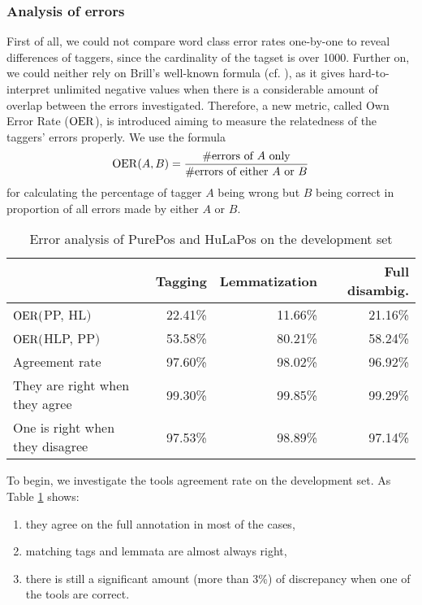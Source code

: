 \subsubsection{Analysis of errors}

First of all, we could not compare word class error rates one-by-one to reveal differences of taggers, since the cardinality of the tagset is over 1000.
Further on, we could neither rely on Brill's well-known formula (cf. \cite{Brill1998}), as it gives hard-to-interpret unlimited negative values when there is a considerable amount of overlap between the errors investigated.
Therefore, a new metric, called Own Error Rate ($\operatorname{OER}$), is introduced aiming to measure the relatedness of the taggers' errors properly.
We use the formula 
\begin{equation}
\operatorname{OER}(A,B)=\frac{\text{\#errors of }A\text{ only}}{\text{\#errors of either }A\text{ or }B}
\end{equation}
for calculating the percentage of tagger $A$ being wrong but $B$ being correct in proportion of all errors made by either $A$ or $B$.

\begin{table}[h]
\centering
\caption{Error analysis of PurePos and HuLaPos on the development set}\label{tab:comb-disambig-comp}
\begin{tabular}{l r r r}
\hline
& Tagging & Lemmatization & Full disambig. \\
\hline
$\operatorname{OER}($PP, HL$)$ & 22.41\% & 11.66\% & 21.16\% \\
$\operatorname{OER}($HLP, PP$)$ & 53.58\% & 80.21\% & 58.24\% \\
Agreement rate & 97.60\% & 98.02\% & 96.92\% \\
They are right when they agree & 99.30\% & 99.85\% & 99.29\% \\
One is right when they disagree & 97.53\% & 98.89\% & 97.14\% \\
\hline
\end{tabular}
\end{table}

To begin, we investigate the tools agreement rate on the development set.
As Table \ref{tab:comb-disambig-comp} shows:
\begin{enumerate}
 \item they agree on the full annotation in most of the cases,
 \item matching tags and lemmata are almost always right,
 \item there is still a significant amount (more than 3\%) of discrepancy when one of the tools are correct.
\end{enumerate}

